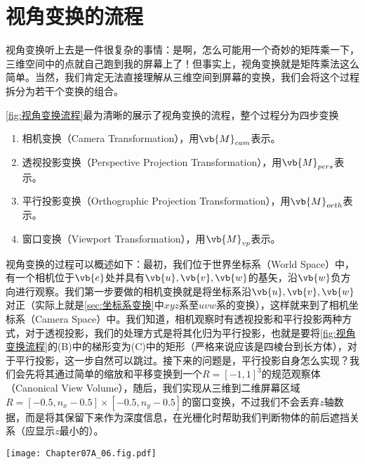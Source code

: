 \section{视角变换的流程}

视角变换听上去是一件很复杂的事情：是啊，怎么可能用一个奇妙的矩阵乘一下，三维空间中的点就自己跑到我的屏幕上了！但事实上，视角变换就是矩阵乘法这么简单。当然，我们肯定无法直接理解从三维空间到屏幕的变换，我们会将这个过程拆分为若干个变换的组合。

\cref{fig:视角变换流程}最为清晰的展示了视角变换的流程，整个过程分为四步变换
\begin{enumerate}
    \item 相机变换（Camera Transformation），用$\vb{M}_{cam}$表示。
    \item 透视投影变换（Perspective Projection Transformation），用$\vb{M}_{pers}$表示。
    \item 平行投影变换（Orthographic Projection Transformation），用$\vb{M}_{orth}$表示。
    \item 窗口变换（Viewport Transformation），用$\vb{M}_{vp}$表示。
\end{enumerate}
视角变换的过程可以概述如下：最初，我们位于世界坐标系（World Space）中，有一个相机位于$\vb{e}$处并具有$\vb{u},\vb{v},\vb{w}$的基矢，沿$\vb{w}$负方向进行观察。我们第一步要做的相机变换就是将坐标系沿$\vb{u},\vb{v},\vb{w}$对正（实际上就是\cref{sec:坐标系变换}中$xyz$系至$uvw$系的变换），这样就来到了相机坐标系（Camera Space）中。我们知道，相机观察时有透视投影和平行投影两种方式，对于透视投影，我们的处理方式是将其化归为平行投影，也就是要将\cref{fig:视角变换流程}的(B)中的梯形变为(C)中的矩形（严格来说应该是四棱台到长方体），对于平行投影，这一步自然可以跳过。接下来的问题是，平行投影自身怎么实现？我们会先将其通过简单的缩放和平移变换到一个$R=[-1,1]^3$的规范观察体（Canonical View Volume），随后，我们实现从三维到二维屏幕区域$R=[-0.5,n_x-0.5]\times[-0.5,n_y-0.5]$的窗口变换，不过我们不会丢弃$z$轴数据，而是将其保留下来作为深度信息，在光栅化时帮助我们判断物体的前后遮挡关系（应显示$z$最小的）。

\begin{Figure}[视角变换流程]
    \texttt{[image: Chapter07A\_06.fig.pdf]}
\end{Figure}